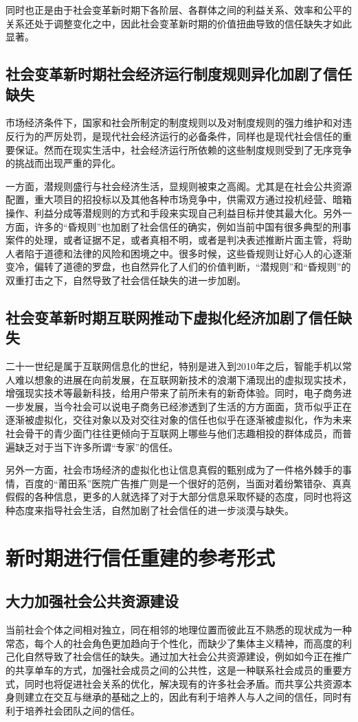 \documentclass[UTF8]{ctexart}
\begin{document}
    同时也正是由于社会变革新时期下各阶层、各群体之间的利益关系、效率和公平的关系还处于调整变化之中，因此社会变革新时期的价值扭曲导致的信任缺失才如此显著。

    \subsection{社会变革新时期社会经济运行制度规则异化加剧了信任缺失}
    市场经济条件下，国家和社会所制定的制度规则以及对制度规则的强力维护和对违反行为的严厉处罚，是现代社会经济运行的必备条件，同样也是现代社会信任的重要保证。然而在现实生活中，社会经济运行所依赖的这些制度规则受到了无序竞争的挑战而出现严重的异化。

    一方面，潜规则盛行与社会经济生活，显规则被束之高阁。尤其是在社会公共资源配置，重大项目的招投标以及其他各种市场竞争中，供需双方通过投机经营、暗箱操作、利益分成等潜规则的方式和手段来实现自己利益目标并使其最大化。另外一方面，许多的“昏规则”也加剧了社会信任的确实，例如当前中国有很多典型的刑事案件的处理，或者证据不足，或者真相不明，或者是判决表述推断片面主管，将助人者陷于道德和法律的风险和困境之中。很多时候，这些昏规则让好心人的心逐渐变冷，偏转了道德的罗盘，也自然异化了人们的价值判断，“潜规则”和“昏规则”的双重打击之下，自然导致了社会信任缺失的进一步加剧。

    \subsection{社会变革新时期互联网推动下虚拟化经济加剧了信任缺失}
    二十一世纪是属于互联网信息化的世纪，特别是进入到2010年之后，智能手机以常人难以想象的进展在向前发展，在互联网新技术的浪潮下涌现出的虚拟现实技术，增强现实技术等最新科技，给用户带来了前所未有的新奇体验。同时，电子商务进一步发展，当今社会可以说电子商务已经渗透到了生活的方方面面，货币似乎正在逐渐被虚拟化，交往对象以及对交往对象的信任也似乎在逐渐被虚拟化，作为未来社会骨干的青少面门往往更倾向于互联网上哪些与他们志趣相投的群体成员，而普遍缺乏对于当下许多所谓“专家”的信任。

    另外一方面，社会市场经济的虚拟化也让信息真假的甄别成为了一件格外棘手的事情，百度的“莆田系”医院广告推广则是一个很好的范例，当面对着纷繁错杂、真真假假的各种信息，更多的人就选择了对于大部分信息采取怀疑的态度，同时也将这种态度来指导社会生活，自然加剧了社会信任的进一步淡漠与缺失。

    \section{新时期进行信任重建的参考形式}
    \subsection{大力加强社会公共资源建设}
    当前社会个体之间相对独立，同在相邻的地理位置而彼此互不熟悉的现状成为一种常态，每个人的社会角色更加趋向于个性化，而缺少了集体主义精神，而高度的利己化自然导致了社会信任的缺失。通过加大社会公共资源建设，例如如今正在推广的共享单车的方式，加强社会成员之间的公共性，这是一种联系社会成员的重要方式，同时也将促进社会关系的优化，解决现有的许多社会矛盾。而共享公共资源本身则建立在交互与继承的基础之上的，因此有利于培养人与人之间的信任，同时有利于培养社会团队之间的信任。
\end{document}
